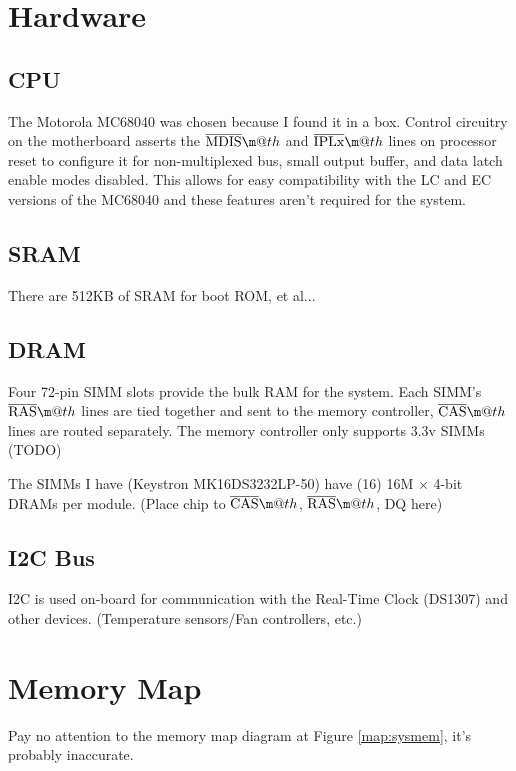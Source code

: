\documentclass{article}
\makeatletter
\newcommand*{\textoverline}[1]{$\overline{\hbox{#1}}\m@th$}
\makeatother
\begin{document}
\section{Hardware}

\subsection{CPU}

The Motorola MC68040 was chosen because I found it in a box. Control circuitry
on the motherboard asserts the \textoverline{MDIS} and \textoverline{IPLx} lines
on processor reset to configure it for non-multiplexed bus, small output buffer,
and data latch enable modes disabled. This allows for easy compatibility with
the LC and EC versions of the MC68040 and these features aren't required for
the system.

\subsection{SRAM}

There are 512KB of SRAM for boot ROM, et al...

\subsection{DRAM}

Four 72-pin SIMM slots provide the bulk RAM for the system. Each SIMM's
\textoverline{RAS} lines are tied together and sent to the memory controller,
\textoverline{CAS} lines are routed separately. The memory controller only
supports 3.3v SIMMs (TODO)

The SIMMs I have (Keystron MK16DS3232LP-50) have (16) 16M $\times$ 4-bit DRAMs
per module. (Place chip to \textoverline{CAS}, \textoverline{RAS}, DQ here)

\subsection{I2C Bus}

I2C is used on-board for communication with the Real-Time Clock (DS1307) and
other devices. (Temperature sensors/Fan controllers, etc.)

\section{Memory Map}

Pay no attention to the memory map diagram at Figure \ref{map:sysmem}, it's
probably inaccurate.
\end{document}
